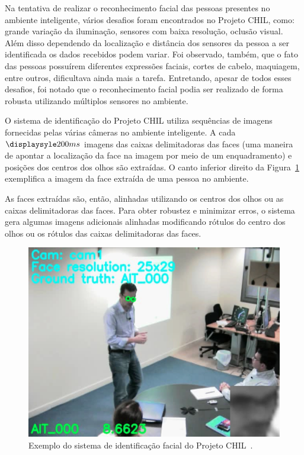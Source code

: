 Na tentativa de realizar o reconhecimento facial das pessoas presentes no ambiente inteligente, vários desafios foram encontrados no Projeto CHIL, como: grande variação da iluminação, sensores com baixa resolução, oclusão visual. Além disso dependendo da localização e distância dos sensores da pessoa a ser identificada os dados recebidos podem variar. Foi observado, também, que o fato das pessoas possuírem diferentes expressões faciais, cortes de cabelo, maquiagem, entre outros, dificultava ainda mais a tarefa. Entretando, apesar de todos esses desafios, foi notado que o reconhecimento facial podia ser realizado de forma robusta utilizando múltiplos sensores no ambiente.

O sistema de identificação do Projeto CHIL utiliza sequências de imagens fornecidas pelas várias câmeras no ambiente inteligente. A cada $\displaysyle 200ms$ imagens das caixas delimitadoras das faces (uma maneira de apontar a localização da face na imagem por meio de um enquadramento) e posições dos centros dos olhos são extraídas. O canto inferior direito da Figura~\ref{chil} exemplifica a imagem da face extraída de uma pessoa no ambiente.

As faces extraídas são, então, alinhadas utilizando os centros dos olhos ou as caixas delimitadoras das faces. Para obter robustez e minimizar erros, o sistema gera algumas imagens adicionais alinhadas modificando rótulos do centro dos olhos ou os rótulos das caixas delimitadoras das faces.

	\begin{figure}[hbt]
		\begin{center}
			\includegraphics[scale=0.4]{figuras/3.TrabalhosCorrelatos/chil.png}
		\end{center}
		\caption{Exemplo do sistema de identificação facial do Projeto CHIL~\cite{chil}.}
		\label{chil}
	\end{figure}


